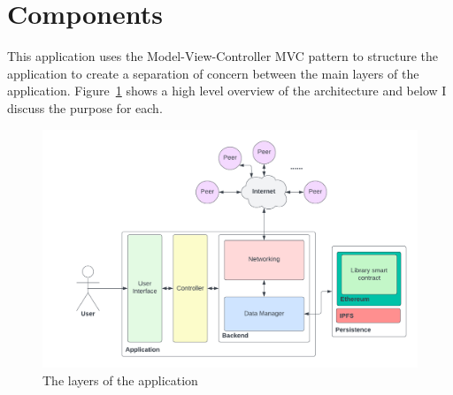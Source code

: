 
\section{Components}

This application uses the Model-View-Controller MVC pattern to structure the application to create a separation of concern between the main layers of the application. Figure~\ref{fig:impl-layers} shows a high level overview of the architecture and below I discuss the purpose for each.

\begin{figure}[ht]
  \centering
  \includegraphics[width=.8\textwidth]{assets/images/diagrams/layers.png}
  \caption{The layers of the application}
  \label{fig:impl-layers}
\end{figure}






